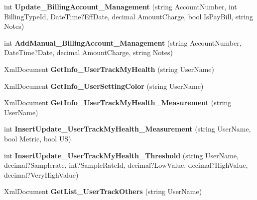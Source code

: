 \begin{DoxyCompactItemize}
\item 
\hypertarget{class_data_service_a26bde1ff50bb94037c7324af5ba4e795}{int {\bfseries Update\-\_\-\-Billing\-Account\-\_\-\-Management} (string Account\-Number, int Billing\-Type\-Id, Date\-Time?Eff\-Date, decimal Amount\-Charge, bool Is\-Pay\-Bill, string Notes)}\label{class_data_service_a26bde1ff50bb94037c7324af5ba4e795}

\item 
\hypertarget{class_data_service_a553d0998b3c0fbaea139f006de1a5c0f}{int {\bfseries Add\-Manual\-\_\-\-Billing\-Account\-\_\-\-Management} (string Account\-Number, Date\-Time?Date, decimal Amount\-Charge, string Notes)}\label{class_data_service_a553d0998b3c0fbaea139f006de1a5c0f}

\item 
\hypertarget{class_data_service_a2d26809cb72e2d690ed78a20b1301bba}{Xml\-Document {\bfseries Get\-Info\-\_\-\-User\-Track\-My\-Health} (string User\-Name)}\label{class_data_service_a2d26809cb72e2d690ed78a20b1301bba}

\item 
\hypertarget{class_data_service_a901c832f7c00ea5f037d3873c2eba919}{Xml\-Document {\bfseries Get\-Info\-\_\-\-User\-Setting\-Color} (string User\-Name)}\label{class_data_service_a901c832f7c00ea5f037d3873c2eba919}

\item 
\hypertarget{class_data_service_a17b86dc7d61f4881b8fdbfe1aa4b3dfc}{Xml\-Document {\bfseries Get\-Info\-\_\-\-User\-Track\-My\-Health\-\_\-\-Measurement} (string User\-Name)}\label{class_data_service_a17b86dc7d61f4881b8fdbfe1aa4b3dfc}

\item 
\hypertarget{class_data_service_a646fbf6e43038f0c6ea0b2e81332a2c8}{int {\bfseries Insert\-Update\-\_\-\-User\-Track\-My\-Health\-\_\-\-Measurement} (string User\-Name, bool Metric, bool U\-S)}\label{class_data_service_a646fbf6e43038f0c6ea0b2e81332a2c8}

\item 
\hypertarget{class_data_service_a8e57055390fa4c70cc327d862f157676}{int {\bfseries Insert\-Update\-\_\-\-User\-Track\-My\-Health\-\_\-\-Threshold} (string User\-Name, decimal?Samplerate, int?Sample\-Rate\-Id, decimal?Low\-Value, decimal?High\-Value, decimal?Very\-High\-Value)}\label{class_data_service_a8e57055390fa4c70cc327d862f157676}

\item 
\hypertarget{class_data_service_a0783c7cb8d0be5da111bd9353cd883e7}{Xml\-Document {\bfseries Get\-List\-\_\-\-User\-Track\-Others} (string User\-Name)}\label{class_data_service_a0783c7cb8d0be5da111bd9353cd883e7}


\end{DoxyCompactItemize}
